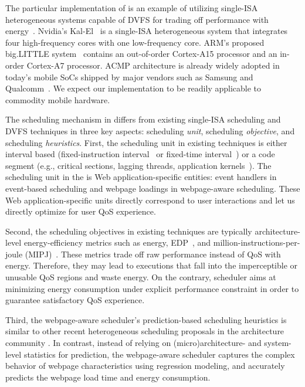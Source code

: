 The particular implementation of \webrt is an example of utilizing single-ISA heterogeneous systems capable of DVFS for trading off performance with energy~\cite{single-ISA}. Nvidia's Kal-El~\cite{Tegra3} is a single-ISA heterogeneous system that integrates four high-frequency cores with one low-frequency core. ARM's proposed big.LITTLE system~\cite{big.little} contains an out-of-order Cortex-A15 processor and an in-order Cortex-A7 processor. ACMP architecture is already widely adopted in today's mobile SoCs shipped by major vendors such as Samsung and Qualcomm~\cite{exynos5biglittle}. We expect our \webrt implementation to be readily applicable to commodity mobile hardware.

The scheduling mechanism in \webrt differs from existing single-ISA scheduling and DVFS techniques in three key aspects: scheduling \textit{unit}, scheduling \textit{objective}, and scheduling \textit{heuristics}. First, the scheduling unit in existing techniques is either interval based (fixed-instruction interval~\cite{single-ISA,compositecores,tracephase,tm,DVFSPred} or fixed-time interval~\cite{DCS,MIPJ,PIE,ondemand,unfairsched}) or a code segment (e.g., critical sections, lagging threads, application kernels~\cite{acs,bis,uba,YinYang}). The scheduling unit in the \webrt is Web application-specific entities: event handlers in event-based scheduling and webpage loadings in webpage-aware scheduling. These Web application-specific units directly correspond to user interactions and let us directly optimize for user QoS experience.

Second, the scheduling objectives in existing techniques are typically architecture-level energy-efficiency metrics such as energy, EDP~\cite{edp}, and million-instructions-per-joule (MIPJ)~\cite{MIPJ}. These metrics trade off raw performance instead of QoS with energy. Therefore, they may lead to executions that fall into the imperceptible or unusable QoS regions and waste energy. On the contrary, \webrt scheduler  aims at minimizing energy consumption under explicit performance constraint in order to guarantee satisfactory QoS experience.

Third, the webpage-aware scheduler's prediction-based scheduling heuristics is similar to other recent heterogeneous scheduling proposals in the architecture community \cite{PIE,compositecores,tracephase,tm}. In contrast, instead of relying on (micro)architecture- and system-level statistics for prediction, the webpage-aware scheduler captures the complex behavior of webpage characteristics using regression modeling, and accurately predicts the webpage load time and energy consumption.

